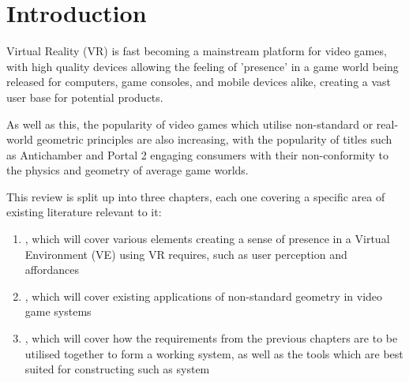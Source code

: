 \section{Introduction}
\label{lr:intro}

\begin{multicols*}{2}
	Virtual Reality (VR) is fast becoming a mainstream platform for video games, with high quality devices allowing the feeling of 'presence' in a game world being released for computers, game consoles, and mobile devices alike, creating a vast user base for potential products.
	
	As well as this, the popularity of video games which utilise non-standard or real-world geometric principles are also increasing, with the popularity of titles such as Antichamber \cite{Antichamber2013} and Portal 2 \cite{Portal22011} engaging consumers with their non-conformity to the physics and geometry of average game worlds.
	
	This review is split up into three chapters, each one covering a specific area of existing literature relevant to it:
	\begin{enumerate}
		\item {}, which will cover various elements creating a sense of presence in a Virtual Environment (VE) using VR requires, such as user perception and affordances
		\item {}, which will cover existing applications of non-standard geometry in video game systems
		\item {}, which will cover how the requirements from the previous chapters are to be utilised together to form a working system, as well as the tools which are best suited for constructing such as system
	\end{enumerate}
	
\end{multicols*}